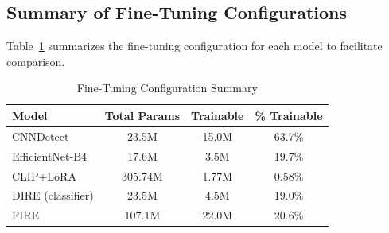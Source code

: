 \subsection{Summary of Fine-Tuning Configurations}
\label{subsec:ft-summary}

Table~\ref{tab:ft-summary} summarizes the fine-tuning configuration for each model to facilitate comparison.

\begin{table}[H]
\centering
\caption{Fine-Tuning Configuration Summary}
\label{tab:ft-summary}
\begin{tabular}{|l|c|c|c|}
\hline
\textbf{Model} & \textbf{Total Params} & \textbf{Trainable} & \textbf{\% Trainable} \\
\hline
CNNDetect & 23.5M & 15.0M & 63.7\% \\
\hline
EfficientNet-B4 & 17.6M & 3.5M & 19.7\% \\
\hline
CLIP+LoRA & 305.74M & 1.77M & 0.58\% \\
\hline
DIRE (classifier) & 23.5M & 4.5M & 19.0\% \\
\hline
FIRE & 107.1M & 22.0M & 20.6\% \\
\hline
\end{tabular}
\end{table}
